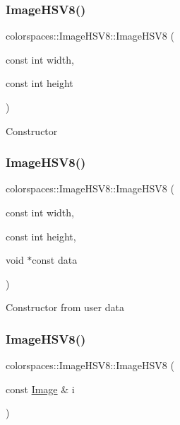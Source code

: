 \subsubsection{\texorpdfstring{Image\+H\+S\+V8()}{ImageHSV8()}\hspace{0.1cm}{\footnotesize\ttfamily [1/3]}}
{\footnotesize\ttfamily colorspaces\+::\+Image\+H\+S\+V8\+::\+Image\+H\+S\+V8 (\begin{DoxyParamCaption}\item[{const int}]{width,  }\item[{const int}]{height }\end{DoxyParamCaption})}

Constructor \mbox{\label{classcolorspaces_1_1_image_h_s_v8_abd2882a640de5b54949d95df94f2e98d}} 
\subsubsection{\texorpdfstring{Image\+H\+S\+V8()}{ImageHSV8()}\hspace{0.1cm}{\footnotesize\ttfamily [2/3]}}
{\footnotesize\ttfamily colorspaces\+::\+Image\+H\+S\+V8\+::\+Image\+H\+S\+V8 (\begin{DoxyParamCaption}\item[{const int}]{width,  }\item[{const int}]{height,  }\item[{void $\ast$const}]{data }\end{DoxyParamCaption})}

Constructor from user data \mbox{\label{classcolorspaces_1_1_image_h_s_v8_a3cb82909c68c5b1f52b7ba34adbc3b3f}} 
\subsubsection{\texorpdfstring{Image\+H\+S\+V8()}{ImageHSV8()}\hspace{0.1cm}{\footnotesize\ttfamily [3/3]}}
{\footnotesize\ttfamily colorspaces\+::\+Image\+H\+S\+V8\+::\+Image\+H\+S\+V8 (\begin{DoxyParamCaption}\item[{const \hyperlink{classcolorspaces_1_1_image}{Image} \&}]{i }\end{DoxyParamCaption})}

